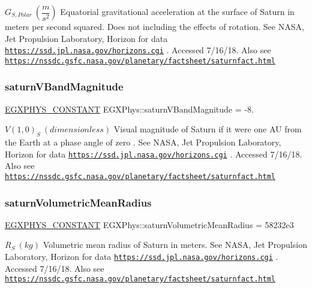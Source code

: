 $ G_{S,Polar} \ (\dfrac{m}{s^2})$ Equatorial gravitational acceleration at the surface of Saturn in meters per second squared. Does not including the effects of rotation. See N\+A\+SA, Jet Propulsion Laboratory, Horizon for data \href{https://ssd.jpl.nasa.gov/horizons.cgi}{\tt https\+://ssd.\+jpl.\+nasa.\+gov/horizons.\+cgi} . Accessed 7/16/18. Also see \href{https://nssdc.gsfc.nasa.gov/planetary/factsheet/saturnfact.html}{\tt https\+://nssdc.\+gsfc.\+nasa.\+gov/planetary/factsheet/saturnfact.\+html} \mbox{\label{group___e_g_x_phys-_constants-_astrophysics-_solar_system-_saturn-_bulk_ga6abf2d485e27e953fd2268bf1bf33bcc}} 
\subsubsection{\texorpdfstring{saturn\+V\+Band\+Magnitude}{saturnVBandMagnitude}}
{\footnotesize\ttfamily \mbox{\hyperlink{group___e_g_x_phys-_constants-_macros_ga76980d288494ce1714c9ac68a95ba702}{E\+G\+X\+P\+H\+Y\+S\+\_\+\+C\+O\+N\+S\+T\+A\+NT}} E\+G\+X\+Phys\+::saturn\+V\+Band\+Magnitude = -\/8.}

$ V(1,0)_{S} \ (dimensionless)$ Visual magnitude of Saturn if it were one AU from the Earth at a phase angle of zero . See N\+A\+SA, Jet Propulsion Laboratory, Horizon for data \href{https://ssd.jpl.nasa.gov/horizons.cgi}{\tt https\+://ssd.\+jpl.\+nasa.\+gov/horizons.\+cgi} . Accessed 7/16/18. Also see \href{https://nssdc.gsfc.nasa.gov/planetary/factsheet/saturnfact.html}{\tt https\+://nssdc.\+gsfc.\+nasa.\+gov/planetary/factsheet/saturnfact.\+html} \mbox{\label{group___e_g_x_phys-_constants-_astrophysics-_solar_system-_saturn-_bulk_gad30162a5ce60a292e31e1c38db97e03c}} 
\subsubsection{\texorpdfstring{saturn\+Volumetric\+Mean\+Radius}{saturnVolumetricMeanRadius}}
{\footnotesize\ttfamily \mbox{\hyperlink{group___e_g_x_phys-_constants-_macros_ga76980d288494ce1714c9ac68a95ba702}{E\+G\+X\+P\+H\+Y\+S\+\_\+\+C\+O\+N\+S\+T\+A\+NT}} E\+G\+X\+Phys\+::saturn\+Volumetric\+Mean\+Radius = 58232e3}

$R_{S} \ (kg)$ Volumetric mean radius of Saturn in meters. See N\+A\+SA, Jet Propulsion Laboratory, Horizon for data \href{https://ssd.jpl.nasa.gov/horizons.cgi}{\tt https\+://ssd.\+jpl.\+nasa.\+gov/horizons.\+cgi} . Accessed 7/16/18. Also see \href{https://nssdc.gsfc.nasa.gov/planetary/factsheet/saturnfact.html}{\tt https\+://nssdc.\+gsfc.\+nasa.\+gov/planetary/factsheet/saturnfact.\+html} 